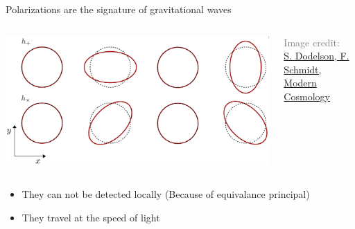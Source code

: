 \begin{frame}{Polarizations are the signature of gravitational waves}
\begin{columns}
\begin{column}{.7\linewidth}
	\includegraphics[width=\linewidth]{img/polarization}
\end{column}
\begin{column}{.3\linewidth}
	\textcolor{gray}{\fontsize{7.5}{10}\selectfont Image credit:\\ \href{https://www.elsevier.com/books/modern-cosmology/dodelson/978-0-12-815948-4}{S. Dodelson, F. Schmidt, Modern Cosmology}}
	\vspace*{\fill}
\end{column}
\end{columns}
\vspace*{\fill}
\begin{itemize}
	\item<3-> They can not be detected locally (Because of equivalance principal)
	\item<4-> They travel at the speed of light
\end{itemize}
\end{frame}


